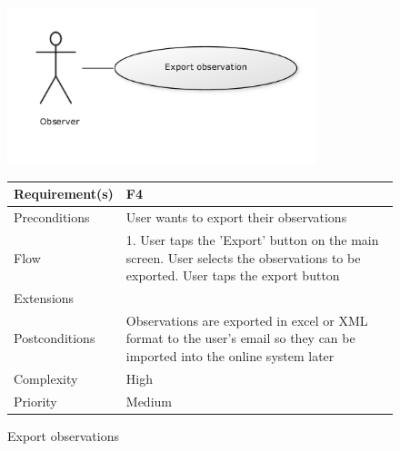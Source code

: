 \begin{figure}[!htb]
		\centering
		\includegraphics[width=0.8\textwidth]{reqspec/uc/export.png}
		\caption{Export observations}
		\label{fig:export}

\begin{tabular}[t]{|l|p{}|}\hline
	Requirement(s)&F4\\\hline
	Preconditions& User wants to export their observations \\\hline
	Flow&1. User taps the 'Export' button on the main screen\newline
	2. User selects the observations to be exported\newline
	3. User taps the export button\\\hline
	Extensions& \\\hline
	Postconditions&Observations are exported in excel or XML format to the user's email so they can be imported into the online system later\\\hline
	Complexity&High\\\hline
	Priority&Medium\\\hline
\end{tabular}
\end{figure}


\clearpage


